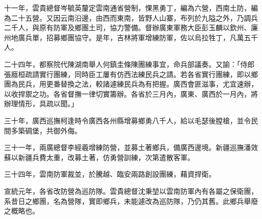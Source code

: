 \begin{pinyinscope}
十一年，雲貴總督岑毓英釐定雲南通省營制，惈黑勇丁，編為六營，西南土防，編為二十五營。又因云南沿邊，由西而東南，皆野人山寨，布列於九隘之外，乃調兵二千人，與原有防軍及鄉團土司，協力警備。督辦廣東軍務大臣彭玉麟以欽州、廉州地廣兵單，招募鄉團協守。是年，吉林將軍增練防軍，佐以烏拉牲丁，凡萬五千人。

二十四年，都察院代陳湖南舉人何鎮圭條陳團練事宜，命兵部議奏。又諭：「侍郎張廕桓疏請實行團練，同時臣工屢有仿西法練民兵之請。若各省實行團練，即以鄉團為民兵，用更番替換之法，較諸遽練民兵為有把握。廣西會匪滋事，尤宜速辦，以收捍禦之功。各省督撫一律切實籌辦。各省於三月內，廣東、廣西於一月內，將辦理情形，具疏以聞。」

三十年，廣西巡撫柯逢時令廣西各州縣增募鄉勇八千人，給以毛瑟後膛槍，並令民間多築碉堡，共御外侮。

三十一年，兩廣總督李經羲增練防營，並募土著鄉兵，備廣西邊境。新疆巡撫潘效蘇以新疆兵費太重，改募土著，仿勇營訓練，次第遣散客軍。

三十四年，雲南防軍裁並，於騰越、臨安兩路創設團練，藉資捍衛。

宣統元年，各省改防營為巡防隊。雲貴總督沈秉堃以雲南防軍內有各屬之保衛團，系昔日之鄉團，名為營隊，實即鄉兵，未能遽改為巡防隊，乃仍其舊。此鄉兵舉廢之概略也。


\end{pinyinscope}
